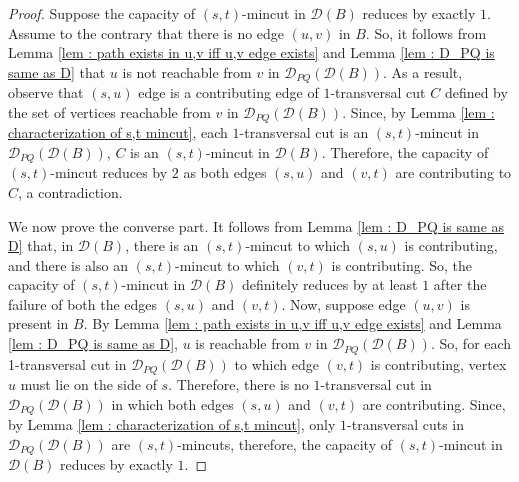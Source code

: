 \documentclass[letterpaper,11pt]{article}
\begin{document}
\begin{proof}
    Suppose the capacity of $(s,t)$-mincut in ${\mathcal D}(B)$ reduces by exactly $1$. Assume to the contrary that there is no edge $(u,v)$ in $B$. So, it follows from Lemma \ref{lem : path exists in u,v iff u,v edge exists} and Lemma \ref{lem : D_PQ is same as D} that $u$ is not reachable from $v$ in ${\mathcal D}_{PQ}({\mathcal D}(B))$. As a result, observe that $(s,u)$ edge is a contributing edge of $1$-transversal cut $C$ defined by the set of vertices reachable from $v$ in ${\mathcal D}_{PQ}({\mathcal D}(B))$. Since, by Lemma \ref{lem : characterization of s,t mincut}, each $1$-transversal cut is an $(s,t)$-mincut in ${\mathcal D}_{PQ}({\mathcal D}(B))$, $C$ is an $(s,t)$-mincut in ${\mathcal D}(B)$. Therefore, the capacity of $(s,t)$-mincut reduces by $2$ as both edges $(s,u)$ and $(v,t)$ are contributing to $C$, a contradiction.      


    We now prove the converse part. It follows from Lemma \ref{lem : D_PQ is same as D} that, in ${\mathcal D}(B)$, there is an $(s,t)$-mincut to which $(s,u)$ is contributing, and there is also an $(s,t)$-mincut to which $(v,t)$ is contributing. So, the capacity of $(s,t)$-mincut in ${\mathcal D}(B)$ definitely reduces by at least $1$ after the failure of both the edges $(s,u)$ and $(v,t)$. Now, suppose edge $(u,v)$ is present in $B$. 
By Lemma \ref{lem : path exists in u,v iff u,v edge exists} and Lemma \ref{lem : D_PQ is same as D}, $u$ is reachable from $v$ in ${\mathcal D}_{PQ}({\mathcal D}(B))$. So, for each 1-transversal cut in ${\mathcal D}_{PQ}({\mathcal D}(B))$ to which edge $(v,t)$ is contributing, vertex $u$ must lie on the side of $s$. Therefore, there is no $1$-transversal cut in ${\mathcal D}_{PQ}({\mathcal D}(B))$ in which both edges $(s,u)$ and $(v,t)$ are contributing. Since, by Lemma \ref{lem : characterization of s,t mincut}, only $1$-transversal cuts in ${\mathcal D}_{PQ}({\mathcal D}(B))$ are $(s,t)$-mincuts, therefore, the capacity of $(s,t)$-mincut in ${\mathcal D}(B)$ reduces by exactly $1$.
\end{proof}
\end{document}
